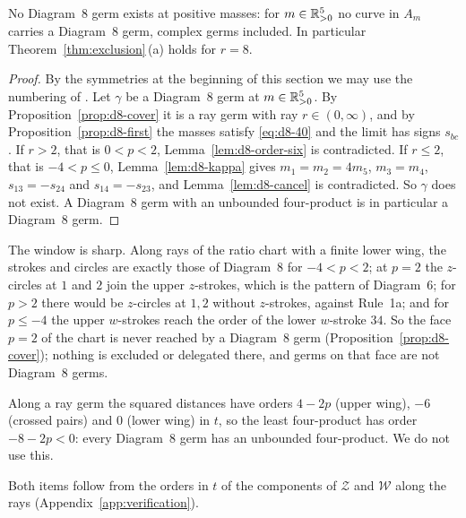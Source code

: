 \begin{theorem}\label{thm:d8}
No Diagram~8 germ exists at positive masses: for $m\in\mathbb{R}_{>0}^5$ no curve in $A_m$ carries a
Diagram~8 germ, complex germs included.  In particular Theorem~\ref{thm:exclusion}\,(a) holds
for $r=8$.
\end{theorem}

\begin{proof}
By the symmetries at the beginning of this section we may use the numbering of
\cite[\S8.8]{AK}.  Let $\gamma$ be a Diagram~8 germ at $m\in\mathbb{R}_{>0}^5$.  By
Proposition~\ref{prop:d8-cover} it is a ray germ with ray $r\in(0,\infty)$, and by
Proposition~\ref{prop:d8-first} the masses satisfy \eqref{eq:d8-40} and the limit has signs
$s_{bc}$.  If $r>2$, that is $0<p<2$, Lemma~\ref{lem:d8-order-six} is contradicted.  If $r\le2$,
that is $-4<p\le0$, Lemma~\ref{lem:d8-kappa} gives $m_1=m_2=4m_5$, $m_3=m_4$, $s_{13}=-s_{24}$
and $s_{14}=-s_{23}$, and Lemma~\ref{lem:d8-cancel} is contradicted.  So $\gamma$ does not exist.
A Diagram~8 germ with an unbounded four-product is in particular a Diagram~8 germ.
\end{proof}

\begin{remark}\label{rem:d8-window}
\begin{alphalist}
\item The window is sharp.  Along rays of the ratio chart with a finite lower wing, the strokes
and circles are exactly those of Diagram~8 for $-4<p<2$; at $p=2$ the $z$-circles at $1$ and
$2$ join the upper $z$-strokes, which is the pattern of Diagram~6; for $p>2$ there would be
$z$-circles at $1,2$ without $z$-strokes, against Rule~1a; and for $p\le-4$ the upper
$w$-strokes reach the order of the lower $w$-stroke $34$.  So the face $p=2$ of the chart is
never reached by a Diagram~8 germ (Proposition~\ref{prop:d8-cover}); nothing is excluded or
delegated there, and germs on that face are not Diagram~8 germs.
\item Along a ray germ the squared distances have orders $4-2p$ (upper wing), $-6$ (crossed
pairs) and $0$ (lower wing) in $t$, so the least four-product has order $-8-2p<0$: every
Diagram~8 germ has an unbounded four-product.  We do not use this.
\end{alphalist}
Both items follow from the orders in $t$ of the components of $\mathcal Z$ and $\mathcal W$
along the rays (Appendix~\ref{app:verification}).
\end{remark}
